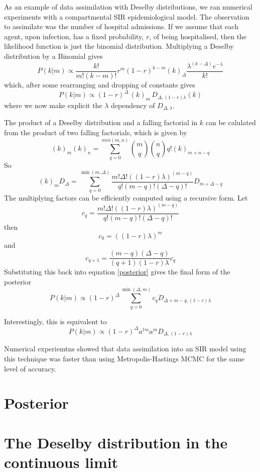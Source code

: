 \documentclass[letterpaper,twocolumn,10pt]{article}
\begin{document}
As an example of data assimilation with Deselby distributions, we ran numerical experiments with a compartmental SIR epidemiological model. The observation to assimilate was the number of hospital admissions. If we assume that each agent, upon infection, has a fixed probability, $r$, of being hospitalised, then the likelihood function is just the binomial distribution. Multiplying a Deselby distribution by a Binomial gives
\[
P(k|m) \propto \frac{k!}{m!(k-m)!}r^m(1-r)^{k-m} (k)_\Delta \frac{\lambda^{(k-\Delta)}e^{-\lambda}}{k!}
\]
which, after some rearranging and dropping of constants gives
\begin{equation}
P(k|m) \propto (1-r)^\Delta \, (k)_m \,D_{\Delta,(1-r)\lambda}(k)
\label{posterior}
\end{equation}
where we now make explicit the $\lambda$ dependency of $D_{\Delta,\lambda}$.

The product of a Deselby distribution and a falling factorial in $k$ can be calulated from the product of two falling factorials, which is given by
\[
(k)_m(k)_n = \sum_{q=0}^{min(m,n)} {m \choose q}{n \choose q}q!(k)_{m+n-q}
\]
So
\[
(k)_m D_\Delta = \sum_{q=0}^{\min(m,\Delta)} \frac{m!\Delta!\left((1-r)\lambda\right)^{(m-q)}}{q!(m-q)!(\Delta-q)!} D_{m+\Delta-q}
\]
The multiplying factors can be efficiently computed using a recursive form. Let
\[
c_q = \frac{m!\Delta!\left((1-r)\lambda\right)^{(m-q)}}{q!(m-q)!(\Delta-q)!}
\]
then
\[
c_0 = ((1-r)\lambda)^m
\]
and
\[
c_{q+1} = \frac{(m-q)(\Delta - q)}{(q+1)(1-r)\lambda} c_q
\]
Substituting this back into equation \ref{posterior} gives the final form of the posterior
\begin{equation}
P(k|m) \propto (1-r)^\Delta \sum_{q=0}^{\min(\Delta,m)} c_q D_{\Delta+m-q,(1-r)\lambda}
\end{equation}

Interestingly, this is equivalent to
\begin{equation}
P(k|m) \propto (1-r)^\Delta a^{\dag m}a^m D_{\Delta,(1-r)\lambda}
\end{equation}


Numerical experiemtns showed that data assimilation into an SIR model using this technique was faster than using Metropolis-Hastings MCMC for the same level of accuracy.

\section{Posterior}

\section{The Deselby distribution in the continuous limit}
\end{document}
